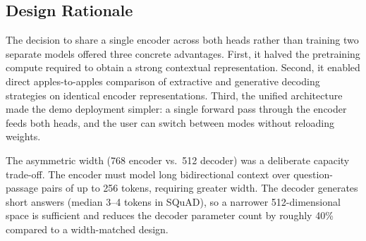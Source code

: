 \documentclass[10pt,twocolumn]{article}
\begin{document}
\subsection{Design Rationale}
The decision to share a single encoder across both heads rather than
training two separate models offered three concrete advantages. First,
it halved the pretraining compute required to obtain a strong
contextual representation. Second, it enabled direct apples-to-apples
comparison of extractive and generative decoding strategies on
identical encoder representations. Third, the unified architecture
made the demo deployment simpler: a single forward pass through the
encoder feeds both heads, and the user can switch between modes
without reloading weights.

The asymmetric width (768 encoder vs.\ 512 decoder) was a deliberate
capacity trade-off. The encoder must model long bidirectional context
over question-passage pairs of up to 256 tokens, requiring greater
width. The decoder generates short answers (median 3--4 tokens in
SQuAD), so a narrower 512-dimensional space is sufficient and reduces
the decoder parameter count by roughly 40\% compared to a
width-matched design.
\end{document}
